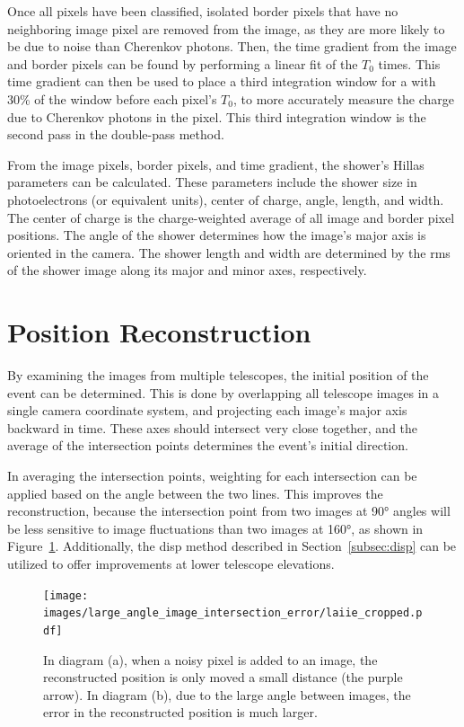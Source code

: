   Once all pixels have been classified, isolated border pixels that have no neighboring image pixel are removed from the image, as they are more likely to be due to noise than Cherenkov photons.
  Then, the time gradient from the image and border pixels can be found by performing a linear fit of the $T_{0}$ times.
  This time gradient can then be used to place a third integration window for a 
with 30\% of the window before each pixel's $T_{0}$, to more accurately measure the charge due to Cherenkov photons in the pixel.
  This third integration window is the second pass in the double-pass method.

  From the image pixels, border pixels, and time gradient, the shower's Hillas parameters \cite{hillas_params} can be calculated.
  These parameters include the shower size in photoelectrons (or equivalent units), center of charge, angle, length, and width.
  The center of charge is the charge-weighted average of all image and border pixel positions.
  The angle of the shower determines how the image's major axis is oriented in the camera.
  The shower length and width are determined by the rms of the shower image along its major and minor axes, respectively.

\section{Position Reconstruction}\label{subsec:posrecon}
  By examining the images from multiple telescopes, the initial position of the event can be determined.
  This is done by overlapping all telescope images in a single camera coordinate system, and projecting each image's major axis backward in time.
  These axes should intersect very close together, and the average of the intersection points determines the event's initial direction.

  In averaging the intersection points, weighting for each intersection can be applied based on the angle between the two lines.
  This improves the reconstruction, because the intersection point from two images at \ang{90} angles will be less sensitive to image fluctuations than two images at \ang{160}, as shown in Figure~\ref{fig:largeintersectangle}.
  Additionally, the disp method described in Section~\ref{subsec:disp} can be utilized to offer improvements at lower telescope elevations.

  \begin{figure}[ht]
    \centering
    \texttt{[image: images/large\_angle\_image\_intersection\_error/laiie\_cropped.pdf]}
    \caption[Large Image Intersection Angles]{
      In diagram (a), when a noisy pixel is added to an image, the reconstructed position is only moved a small distance (the purple arrow).
      In diagram (b), due to the large angle between images, the error in the reconstructed position is much larger.
    }
    \label{fig:largeintersectangle}
  \end{figure}
  \FloatBarrier


